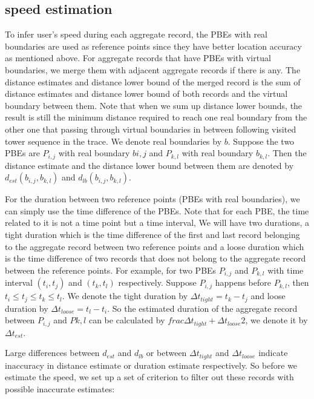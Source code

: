 \subsection{speed estimation}

To infer user's speed during each aggregate record, the PBEs with real boundaries are used as reference points since they have better location accuracy as mentioned above. For aggregate records that have PBEs with virtual boundaries, we merge them with adjacent aggregate records if there is any. The distance estimates and distance lower bound of the merged record is the sum of distance estimates and distance lower bound of both records and the virtual boundary between them. Note that when we sum up distance lower bounds, the result is still the minimum distance required to reach one real boundary from the other one that passing through virtual boundaries in between following visited tower sequence in the trace. We denote real boundaries by $b$. Suppose the two PBEs are $P_{i,j}$ with real boundary $b{i,j}$ and $P_{k,l}$ with real boundary $b_{k,l}$. Then the distance estimate and the distance lower bound between them are denoted by $d_{est}(b_{i,j}, b_{k,l})$ and $d_{lb}(b_{i,j}, b_{k,l})$.

For the duration between two reference points (PBEs with real boundaries), we can simply use the time difference of the PBEs. Note that for each PBE, the time related to it is not a time point but a time interval, We will have two durations, a tight duration which is the time difference of the first and last record belonging to the aggregate record between two reference points and a loose duration which is the time difference of two records that does not belong to the aggregate record between the reference points. For example, for two PBEs $P_{i,j}$ and $P_{k,l}$ with time interval $(t_i, t_j)$ and $(t_k, t_l)$ respectively. Suppose $P_{i,j}$ happens before $P_{k,l}$, then $t_i \leq t_j \leq t_k \leq t_l$. We denote the tight duration by $\Delta t_{tight} = t_k - t_j$ and loose duration by $\Delta t_{loose} = t_l - t_i$. So the estimated duration of the aggregate record between $P_{i,j}$ and $P{k,l}$ can be calculated by $frac{\Delta t_{tight} + \Delta t_{loose}}{2}$, we denote it by $\Delta t_{est}$.

Large differences between $d_{est}$ and $d_{lb}$ or between $\Delta t_{tight}$ and $\Delta t_{loose}$ indicate inaccuracy in distance estimate or duration estimate respectively. So before we estimate the speed, we set up a set of criterion to filter out these records with possible inaccurate estimates:

